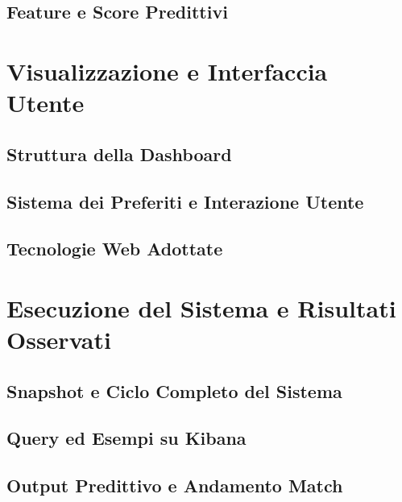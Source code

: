 \documentclass[a4paper,12pt]{report}
\begin{document}
\section{Feature e Score Predittivi}



\chapter{Visualizzazione e Interfaccia Utente}

\section{Struttura della Dashboard}

\section{Sistema dei Preferiti e Interazione Utente}

\section{Tecnologie Web Adottate}



\chapter{Esecuzione del Sistema e Risultati Osservati}

\section{Snapshot e Ciclo Completo del Sistema}

\section{Query ed Esempi su Kibana}

\section{Output Predittivo e Andamento Match}
\end{document}
